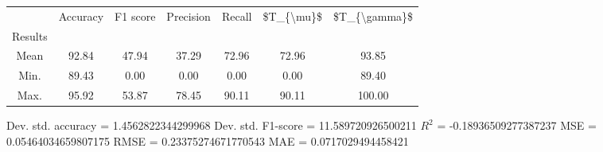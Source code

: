 \begin{tabular}{|c|c|c|c|c|c|c|}
\toprule
{} &  Accuracy &  F1 score &  Precision &  Recall &  \$T\_\{\textbackslash mu\}\$ &  \$T\_\{\textbackslash gamma\}\$ \\
Results &           &           &            &         &            &               \\
\hline
Mean    &     92.84 &     47.94 &      37.29 &   72.96 &      72.96 &         93.85 \\
Min.    &     89.43 &      0.00 &       0.00 &    0.00 &       0.00 &         89.40 \\
Max.    &     95.92 &     53.87 &      78.45 &   90.11 &      90.11 &        100.00 \\
\bottomrule
\end{tabular}

 Dev. std. accuracy = 1.4562822344299968
 Dev. std. F1-score = 11.589720926500211
 $R^2$ = -0.18936509277387237
 MSE = 0.05464034659807175
 RMSE = 0.23375274671770543
 MAE = 0.0717029494458421